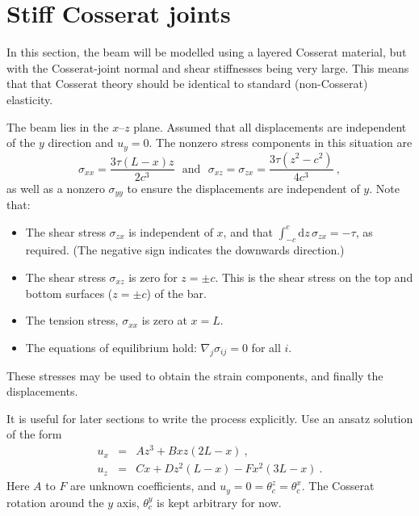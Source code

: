 \documentclass[]{scrreprt}
\begin{document}
\section{Stiff Cosserat joints}

In this section, the beam will be modelled using a layered Cosserat
material, but with the Cosserat-joint normal and shear stiffnesses
being very large.  This means that that Cosserat theory should be
identical to standard (non-Cosserat) elasticity.

The beam lies in the $x$--$z$ plane.  Assumed that all displacements
are independent of the $y$ direction and $u_{y}=0$.  The nonzero
stress components in this situation are
\begin{equation}
\sigma_{xx} = \frac{3\tau (L-x)z}{2c^{3}} \ \ \ \mbox{and}
\ \ \ \sigma_{xz} = \sigma_{zx} = \frac{3\tau(z^{2}-c^{2})}{4c^{3}} \ ,
\end{equation}
as well as a nonzero $\sigma_{yy}$ to ensure the displacements are
independent of $y$.  Note that:
\begin{itemize}
\item The shear stress $\sigma_{zx}$ is independent of $x$, and that
  $\int_{-c}^{c}\mathrm{d}z\, \sigma_{zx} = -\tau$, as required.
  (The negative sign indicates the downwards direction.)
\item The shear stress $\sigma_{xz}$ is zero for $z=\pm c$.  This is
  the shear stress on the top and bottom surfaces ($z=\pm c$) of the
  bar.
\item The tension stress, $\sigma_{xx}$ is zero at $x=L$.
\item The equations of equilibrium hold: $\nabla_{j}\sigma_{ij}=0$ for all $i$.
\end{itemize}
These stresses may be used to obtain the strain components, and
finally the displacements.

It is useful for later sections to write the process explicitly.
Use an ansatz solution of the form
\begin{eqnarray}
u_{x} & = & Az^{3} + Bxz(2L-x) \ , \\
u_{z} & = & Cx + Dz^{2}(L-x) - Fx^{2}(3L-x) \ .
\label{beam.defl.z.eqn}
\end{eqnarray}
Here $A$ to $F$ are unknown coefficients, and
$u_{y}=0=\theta_{c}^{z}=\theta_{c}^{x}$.  The Cosserat rotation around
the $y$ axis, $\theta_{c}^{y}$ is kept arbitrary for now.
\end{document}
